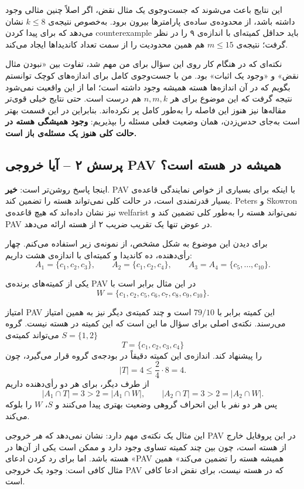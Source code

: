 \documentclass[12pt, a4paper]{article}
\begin{document}
این نتایج باعث می‌شوند که جست‌وجوی یک مثال نقض، اگر اصلاً چنین مثالی وجود داشته باشد، از محدوده‌ی ساده‌ی پارامترها بیرون برود. به‌خصوص نتیجه‌ی $k\le8$ نشان می‌دهد که برای پیدا کردن counterexample باید حداقل کمیته‌ای با اندازه‌ی ۹ را در نظر گرفت؛ نتیجه‌ی $m\le15$ هم همین محدودیت را از سمت تعداد کاندیداها ایجاد می‌کند. \cite{peters2025core}

نکته‌ای که در هنگام کار روی این سؤال برای من مهم شد، تفاوت بین «نبودن مثال نقض» و «وجود یک اثبات» بود. من با جست‌وجوی کامل برای اندازه‌های کوچک توانستم بگویم که در آن اندازه‌ها هسته همیشه وجود داشته است؛ اما از این واقعیت نمی‌شود نتیجه گرفت که این موضوع برای هر $n,m,k$ هم درست است. حتی نتایج خیلی قوی‌تر مقاله‌ها نیز هنوز این فاصله را به‌طور کامل پر نکرده‌اند. بنابراین در این قسمت بهتر است به‌جای حدس‌زدن، همان وضعیت فعلی مسئله را بپذیریم: \textbf{وجود همیشگی هسته در حالت کلی هنوز یک مسئله‌ی باز است.}

\subsection{پرسش ۲ -- آیا خروجی PAV همیشه در هسته است؟}

اینجا پاسخ روشن‌تر است: \textbf{خیر}. PAV با اینکه برای بسیاری از خواص نمایندگی قاعده‌ی بسیار قدرتمندی است، در حالت کلی نمی‌تواند هسته را تضمین کند. Peters و Skowron نیز نشان داده‌اند که هیچ قاعده‌ی welfarist نمی‌تواند هسته را به‌طور کلی تضمین کند و PAV در عوض تنها یک تقریب ضریب ۲ از هسته ارائه می‌دهد. \cite{peters2020welfarism}

برای دیدن این موضوع به شکل مشخص، از نمونه‌ی زیر استفاده می‌کنم. چهار رأی‌دهنده، ده کاندیدا و کمیته‌ای با اندازه‌ی هشت داریم:
\[
A_1=\{c_1,c_2,c_3\},\qquad
A_2=\{c_1,c_2,c_4\},\qquad
A_3=A_4=\{c_5,\dots,c_{10}\}.
\]

یکی از کمیته‌های برنده‌ی PAV در این مثال برابر است با
\[
W=\{c_1,c_2,c_5,c_6,c_7,c_8,c_9,c_{10}\}.
\]

امتیاز PAV این کمیته برابر با $79/10$ است و چند کمیته‌ی دیگر نیز به همین امتیاز می‌رسند. نکته‌ی اصلی برای سؤال ما این است که این کمیته در هسته نیست. گروه $S=\{1,2\}$ می‌تواند کمیته‌ی
\[
T=\{c_1,c_2,c_3,c_4\}
\]
را پیشنهاد کند. اندازه‌ی این کمیته دقیقاً در بودجه‌ی گروه قرار می‌گیرد، چون
\[
|T|=4\le\frac{2}{4}\cdot8=4.
\]
از طرف دیگر، برای هر دو رأی‌دهنده داریم
\[
|A_1\cap T|=3>2=|A_1\cap W|,
\qquad
|A_2\cap T|=3>2=|A_2\cap W|.
\]
پس هر دو نفر با این انحراف گروهی وضعیت بهتری پیدا می‌کنند و $S$، $W$ را بلوکه می‌کند.

این مثال یک نکته‌ی مهم دارد: نشان نمی‌دهد که \emph{هر} خروجی PAV در این پروفایل خارج از هسته است، چون بین چند کمیته تساوی وجود دارد و ممکن است یکی از آن‌ها در هسته باشد. اما برای رد کردن ادعای «PAV همیشه هسته را تضمین می‌کند» همین مثال کافی است: وجود یک خروجی PAV که در هسته نیست، برای نقض ادعا کافی است.
\end{document}
